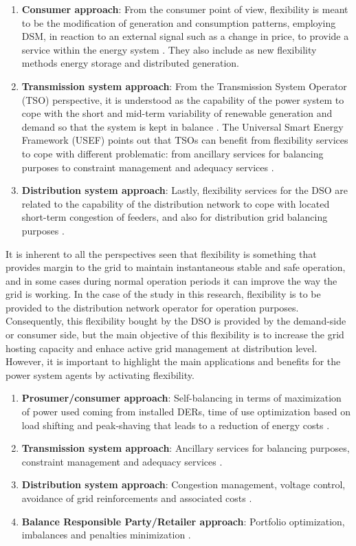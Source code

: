 \begin{enumerate}
\item \textbf{Consumer approach}: From the consumer point of view, flexibility is meant to be the modification of generation and consumption patterns, employing DSM, in reaction to an external signal such as a change in price, to provide a service within the energy system \cite{OfficeofGasandElectricityMarketsOfgem2015}. They also include as new flexibility methods energy storage and distributed generation. 
\item \textbf{Transmission system approach}: From the Transmission System Operator (TSO) perspective, it is understood as the capability of the power system to cope with the short and mid-term variability of renewable generation and demand so that the system is kept in balance \cite{Profumo2016, EuropeanNetworkofTransmissionSystemOperatorsforElectricityENTSO-E2015}.
The Universal Smart Energy Framework (USEF) points out that TSOs can benefit from flexibility services to cope with different problematic: from ancillary services for balancing purposes to constraint management and adequacy services \cite{USEF2018}.
\item \textbf{Distribution system approach}: Lastly, flexibility services for the DSO are related to the capability of the distribution network to cope with located short-term congestion of feeders, and also for distribution grid balancing purposes \cite{Minniti_2018, Khatami2018}. 
\end{enumerate}
It is inherent to all the perspectives seen that flexibility is something that provides margin to the grid to maintain instantaneous stable and safe operation, and in some cases during normal operation periods it can improve the way the grid is working. In the case of the study in this research, flexibility is to be provided to the distribution network operator for operation purposes. Consequently, this flexibility bought by the DSO is provided by the demand-side or consumer side, but the main objective of this flexibility is to increase the grid hosting capacity and enhace active grid management at distribution level. However, it is important to highlight the main applications and benefits for the power system agents by activating flexibility. 

\begin{enumerate}
\item \textbf{Prosumer/consumer approach}: Self-balancing in terms of maximization of power used coming from installed DERs, time of use optimization based on load shifting and peak-shaving that leads to a reduction of energy costs \cite{Olivella-Rosell2018}.
\item \textbf{Transmission system approach}: Ancillary services for balancing purposes, constraint management and adequacy services \cite{USEF2018}.
\item \textbf{Distribution system approach}: Congestion management, voltage control, avoidance of grid reinforcements and associated costs \cite{USEF2018, Olivella-Rosell2018}.
\item \textbf{Balance Responsible Party/Retailer approach}: Portfolio optimization, imbalances and penalties minimization \cite{Olivella-Rosell2018}.
\end{enumerate}

